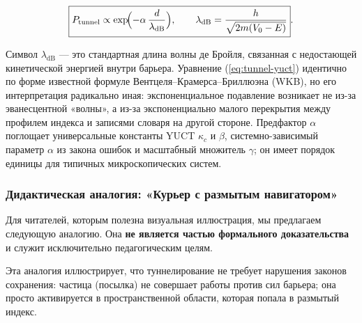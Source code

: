 \documentclass[12pt,a4paper]{article}
\theoremstyle{remark}
\begin{document}
	\begin{equation}
		\boxed{ P_{\mathrm{tunnel}} \propto \exp\!\Bigl( -\alpha \,
			\frac{d}{\lambda_{\mathrm{dB}}} \Bigr),
			\qquad
			\lambda_{\mathrm{dB}} = \frac{h}{\sqrt{2m(V_0-E)}} }.
		\label{eq:tunnel-yuct}
	\end{equation}
	
	Символ $\lambda_{\mathrm{dB}}$ — это стандартная длина волны де Бройля, связанная с недостающей кинетической энергией внутри барьера. Уравнение (\ref{eq:tunnel-yuct}) идентично по форме известной формуле Вентцеля–Крамерса–Бриллюэна (WKB), но его интерпретация радикально иная: экспоненциальное подавление возникает не из-за эванесцентной «волны», а из-за экспоненциально малого перекрытия между профилем индекса и записями словаря на другой стороне. Предфактор $\alpha$ поглощает универсальные константы YUCT $\kappa_c$ и $\beta$, системно-зависимый параметр $\alpha$ из закона ошибок и масштабный множитель $\gamma$; он имеет порядок единицы для типичных микроскопических систем.
	
	\subsubsection{Дидактическая аналогия: «Курьер с размытым навигатором»}
	
	Для читателей, которым полезна визуальная иллюстрация, мы предлагаем следующую аналогию. Она \textbf{не является частью формального доказательства} и служит исключительно педагогическим целям.
	
	\medskip
	\medskip
	
	Эта аналогия иллюстрирует, что туннелирование не требует нарушения законов сохранения: частица (посылка) не совершает работы против сил барьера; она просто активируется в пространственной области, которая попала в размытый индекс.
	
\end{document}
